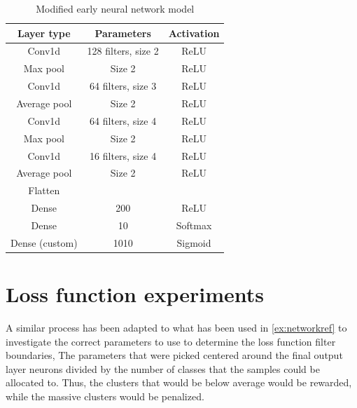 \begin{table}[ht]
    \centering
    \begin{tabular}{|c|c|c|}
        \hline
        Layer type & Parameters & Activation\\ \hline
        Conv1d & 128 filters, size 2 & ReLU\\ \hline
        Max pool & Size 2 & ReLU\\ \hline
        Conv1d & 64 filters, size 3 & ReLU\\ \hline
        Average pool & Size 2 & ReLU\\ \hline
        Conv1d & 64 filters, size 4 & ReLU\\ \hline
        Max pool & Size 2 & ReLU\\ \hline
        Conv1d & 16 filters, size 4 & ReLU\\ \hline
        Average pool & Size 2 & ReLU\\ \hline
        Flatten & &\\ \hline
        Dense & 200 & ReLU\\ \hline
        Dense & 10 & Softmax \\ \hline
        Dense (custom) & 1010 & Sigmoid \\ \hline
    \end{tabular}
    \caption{Modified early neural network model}
    \label{tab:finalmodel}
\end{table}




\section{Loss function experiments}
\label{ex:loss}

A similar process has been adapted to what has been used in \cref{ex:networkref} to investigate the correct parameters to use to determine the loss function filter boundaries,
The parameters that were picked centered around the final output layer neurons divided by the number of classes that the samples could be allocated to.
Thus, the clusters that would be below average would be rewarded, while the massive clusters would be penalized.

